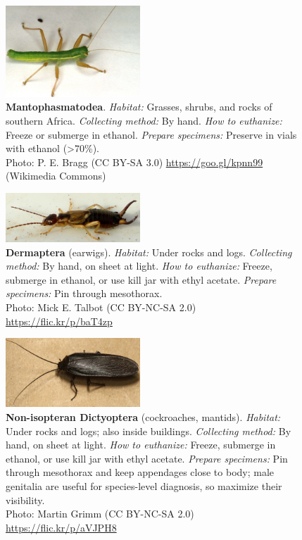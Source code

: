 \documentclass[letterpaper, 11pt]{article}
\begin{document}
\begin{figure}
  \caption*{\textbf{Mantophasmatodea}. \textit{Habitat:} Grasses, shrubs, and rocks of southern Africa. \textit{Collecting method:} By hand. \textit{How to euthanize:} Freeze or submerge in ethanol. \textit{Prepare specimens:} Preserve in vials with ethanol (\textgreater70\%).\\ Photo: P. E. Bragg (CC BY-SA 3.0) \url{https://goo.gl/kpnn99} (Wikimedia Commons)}
  \includegraphics[width=0.45\textwidth]{Mantophasmatodea}
\end{figure}

\begin{figure}
  \caption*{\textbf{Dermaptera} (earwigs). \textit{Habitat:} Under rocks and logs. \textit{Collecting method:} By hand, on sheet at light. \textit{How to euthanize:} Freeze, submerge in ethanol, or use kill jar with ethyl acetate. \textit{Prepare specimens:} Pin through mesothorax.\\ Photo: Mick E. Talbot (CC BY-NC-SA 2.0) \url{https://flic.kr/p/baT4zp}}
  \includegraphics[width=0.45\textwidth]{Dermaptera}
\end{figure}

\begin{figure}
  \caption*{\textbf{Non-isopteran Dictyoptera} (cockroaches, mantids). \textit{Habitat:} Under rocks and logs; also inside buildings. \textit{Collecting method:} By hand, on sheet at light. \textit{How to euthanize:} Freeze, submerge in ethanol, or use kill jar with ethyl acetate. \textit{Prepare specimens:} Pin through mesothorax and keep appendages close to body; male genitalia are useful for species-level diagnosis, so maximize their visibility.\\Photo: Martin Grimm (CC BY-NC-SA 2.0) \url{https://flic.kr/p/aVJPH8}}
  \includegraphics[width=0.45\textwidth]{Blattodea}
\end{figure}
\end{document}
